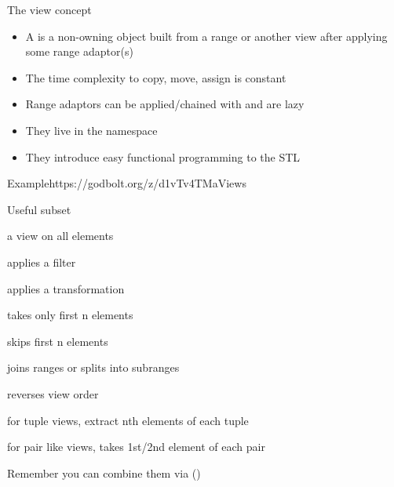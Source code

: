 \begin{frame}[fragile]
  \begin{block}{The view concept}
    \begin{itemize}
    \item A  is a non-owning object built from a range or another view after applying some range adaptor(s)
    \item The time complexity to copy, move, assign is constant
    \item Range adaptors can be applied/chained with \cppinline{|} and are lazy
    \item They live in the  namespace
    \item They introduce easy functional programming to the STL
    \end{itemize}
  \end{block}
  \begin{exampleblockGB}{Example}{https://godbolt.org/z/d1vTv4TMa}{Views}
    { \small
    }
  \end{exampleblockGB}
\end{frame}

\begin{frame}[fragile]
  \begin{block}{Useful subset}
    \begin{description}
    \item[all] a view on all elements
    \item[filter] applies a filter
    \item[transform] applies a transformation
    \item[take] takes only first n elements
    \item[drop] skips first n elements
    \item[join/split] joins ranges or splits into subranges
    \item[reverse] reverses view order
    \item[elements] for tuple views, extract nth elements of each tuple
    \item[keys/values] for pair like views, takes 1st/2nd element of each pair
    \end{description}
  \end{block}
  Remember you can combine them via (\cppinline{|})
\end{frame}

